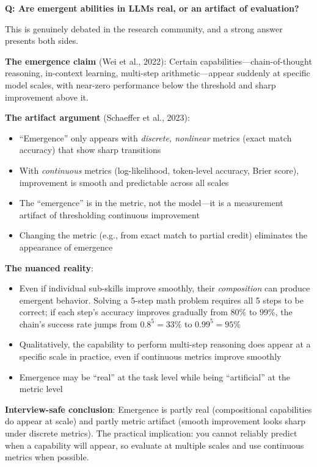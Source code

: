 \begin{interviewq}
\textbf{Q: Are emergent abilities in LLMs real, or an artifact of evaluation?}

 \quad {} \quad \badgefreq{\freqmed}

\stronganswer
This is genuinely debated in the research community, and a strong answer presents both sides.

\textbf{The emergence claim} (Wei et al., 2022): Certain capabilities---chain-of-thought reasoning, in-context learning, multi-step arithmetic---appear suddenly at specific model scales, with near-zero performance below the threshold and sharp improvement above it.

\textbf{The artifact argument} (Schaeffer et al., 2023):
\begin{itemize}
    \item ``Emergence'' only appears with \textit{discrete, nonlinear} metrics (exact match accuracy) that show sharp transitions
    \item With \textit{continuous} metrics (log-likelihood, token-level accuracy, Brier score), improvement is smooth and predictable across all scales
    \item The ``emergence'' is in the metric, not the model---it is a measurement artifact of thresholding continuous improvement
    \item Changing the metric (e.g., from exact match to partial credit) eliminates the appearance of emergence
\end{itemize}

\textbf{The nuanced reality}:
\begin{itemize}
    \item Even if individual sub-skills improve smoothly, their \textit{composition} can produce emergent behavior. Solving a 5-step math problem requires all 5 steps to be correct; if each step's accuracy improves gradually from 80\% to 99\%, the chain's success rate jumps from $0.8^5 = 33\%$ to $0.99^5 = 95\%$
    \item Qualitatively, the capability to perform multi-step reasoning does appear at a specific scale in practice, even if continuous metrics improve smoothly
    \item Emergence may be ``real'' at the task level while being ``artificial'' at the metric level
\end{itemize}

\textbf{Interview-safe conclusion}: Emergence is partly real (compositional capabilities do appear at scale) and partly metric artifact (smooth improvement looks sharp under discrete metrics). The practical implication: you cannot reliably predict when a capability will appear, so evaluate at multiple scales and use continuous metrics when possible.


\end{interviewq}
